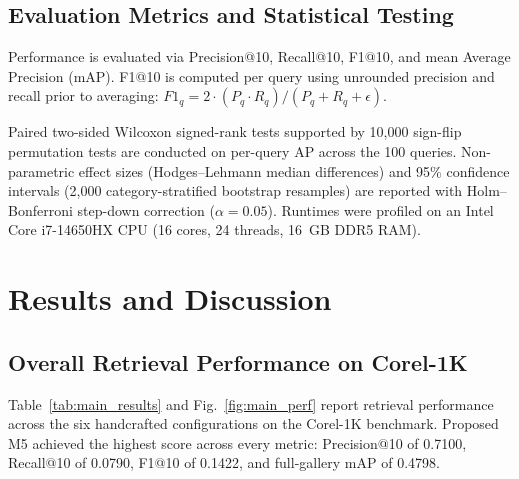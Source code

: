 \documentclass[pdflatex,sn-mathphys-num]{sn-jnl}
\begin{document}
\subsection{Evaluation Metrics and Statistical Testing}
Performance is evaluated via Precision@10, Recall@10, F1@10, and mean Average Precision (mAP). F1@10 is computed per query using unrounded precision and recall prior to averaging: $F1_q = 2 \cdot (P_q \cdot R_q)/(P_q + R_q + \epsilon)$. 

Paired two-sided Wilcoxon signed-rank tests supported by 10,000 sign-flip permutation tests are conducted on per-query AP across the 100 queries. Non-parametric effect sizes (Hodges--Lehmann median differences) and 95\% confidence intervals (2,000 category-stratified bootstrap resamples) are reported with Holm--Bonferroni step-down correction ($\alpha = 0.05$). Runtimes were profiled on an Intel Core i7-14650HX CPU (16 cores, 24 threads, 16~GB DDR5 RAM).

\section{Results and Discussion}\label{sec5}

\subsection{Overall Retrieval Performance on Corel-1K}
Table~\ref{tab:main_results} and Fig.~\ref{fig:main_perf} report retrieval performance across the six handcrafted configurations on the Corel-1K benchmark. Proposed M5 achieved the highest score across every metric: Precision@10 of 0.7100, Recall@10 of 0.0790, F1@10 of 0.1422, and full-gallery mAP of 0.4798.
\end{document}
